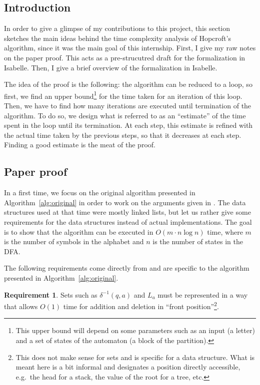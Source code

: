 \documentclass[12pt, a4 paper]{article}
\theoremstyle{definition}
\newtheorem{requirement}{Requirement}
\begin{document}
\subsection{Introduction}

In order to give a glimpse of my contributions to this project, this section sketches the main ideas behind the time complexity analysis of Hopcroft's algorithm, since it was the main goal of this internship. First, I give my raw notes on the paper proof. This acts as a pre-strucutred draft for the formalization in Isabelle. Then, I give a brief overview of the formalization in Isabelle.

\bigskip

The idea of the proof is the following: the algorithm can be reduced to a loop, so first, we find an upper bound\footnote{This upper bound will depend on some parameters such as an input (a letter) and a set of states of the automaton (a block of the partition).} for the time taken for an iteration of this loop. Then, we have to find how many iterations are executed until termination of the algorithm. To do so, we design what is referred to as an ``estimate'' of the time spent in the loop until its termination. At each step, this estimate is refined with the actual time taken by the previous steps, so that it decreases at each step. Finding a good estimate is the meat of the proof.

\subsection{Paper proof}

In a first time, we focus on the original algorithm presented in Algorithm~\ref{alg:original} in order to work on the arguments given in \cite{Hop71}.
The data structures used at that time were mostly linked lists, but let us rather give some requirements for the data structures instead of actual implementations.
The goal is to show that the algorithm can be executed in $O(m \cdot n \log n)$ time, where $m$ is the number of symbols in the alphabet and $n$ is the number of states in the DFA.

The following requirements come directly from \cite{Hop71} and are specific to the algorithm presented in Algorithm~\ref{alg:original}.

\begin{requirement}
    \label{req:1}
Sets such as $\delta^{-1}(q, a)$ and $L_a$ must be represented in a way that allows $O(1)$ time for addition and deletion in ``front position''\footnote{This does not make sense for sets and is specific for a data structure. What is meant here is a bit informal and designates a position directly accessible, e.g.\ the head for a stack, the value of the root for a tree, etc.}.
\end{requirement}
\end{document}
